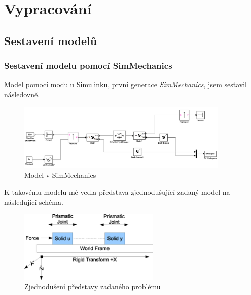 \newcommand{\minuskb}{- k((y - u) - l_{10}) - b(\dot{y} - \dot{u})}
\newcommand{\kb}{k((y - u) - l_{10}) + b(\dot{y} - \dot{u})}

\section{Vypracování}

\subsection{Sestavení modelů}

\subsubsection{Sestavení modelu pomocí SimMechanics}

Model pomocí modulu Simulinku, první generace \textit{SimMechanics}, jsem sestavil následovně. 

\begin{figure}[htbp]
	\centering
	\includegraphics[width=0.9\textwidth]{img/simscape_1st.png}
	\caption{Model v SimMechanics}
\end{figure}
\FloatBarrier

K takovému modelu mě vedla představa zjednodušující zadaný model na následující schéma.

\begin{figure}[htbp]
	\centering
	\includegraphics[width=0.6\textwidth]{img/simplified-model.eps}
	\caption{Zjednodušení představy zadaného problému}
\end{figure}
\FloatBarrier

